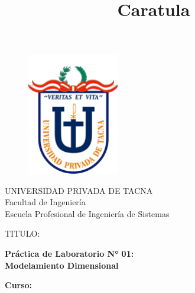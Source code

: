 \documentclass[12pt,letterpaper]{article}
\begin{document}
%


\title{Caratula}

\begin{titlepage}
	\begin{center}
	
	\begin{figure}[htb]
	\begin{center}
	\includegraphics[width=4cm]{./Imagenes/UPT}
	\end{center}
	\end{figure}
	\vspace*{0.15in}
	\large{UNIVERSIDAD PRIVADA DE TACNA}\\
	\vspace*{0.10in}
	\large{Facultad de Ingeniería}\\
	\vspace*{0.10in}
	Escuela Profesional de Ingeniería de Sistemas  \\
	
	\vspace*{0.5in}
	\begin{large}
	TITULO:\\
	\end{large}
	
	\vspace*{0.1in}
	\begin{Large}
	\textbf{Práctica de Laboratorio N° 01: \\ Modelamiento Dimensional} \\
	\end{Large}
	
	\vspace*{0.3in}
	\begin{Large}
	\textbf{Curso:} \\
	\end{Large}
	

\end{center}
\end{titlepage}
\end{document}
